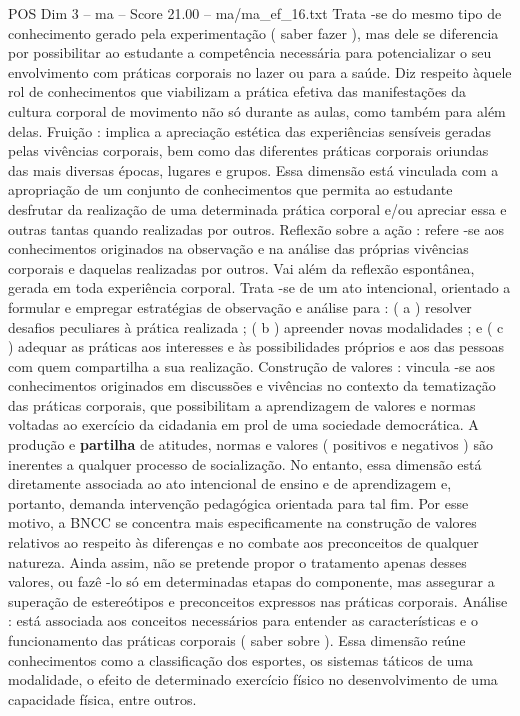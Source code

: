 \begin{textsample}{POS Dim 3 – ma – Score 21.00 – ma/ma\_ef\_16.txt}
Trata -se do mesmo tipo de conhecimento gerado pela experimentação ( saber fazer ), mas dele se diferencia por possibilitar ao estudante a competência necessária para potencializar o seu envolvimento com práticas corporais no lazer ou para a saúde.
Diz respeito àquele rol de conhecimentos que viabilizam a prática efetiva das manifestações da cultura corporal de movimento não só durante as aulas, como também para além delas.
Fruição : implica a apreciação estética das experiências sensíveis geradas pelas vivências corporais, bem como das diferentes práticas corporais oriundas das mais diversas épocas, lugares e grupos.
Essa dimensão está vinculada com a apropriação de um conjunto de conhecimentos que permita ao estudante desfrutar da realização de uma determinada prática corporal e/ou apreciar essa e outras tantas quando realizadas por outros.
Reflexão sobre a ação : refere -se aos conhecimentos originados na observação e na análise das próprias vivências corporais e daquelas realizadas por outros.
Vai além da reflexão espontânea, gerada em toda experiência corporal.
Trata -se de um ato intencional, orientado a formular e empregar estratégias de observação e análise para : ( a ) resolver desafios peculiares à prática realizada ; ( b ) apreender novas modalidades ; e ( c ) adequar as práticas aos interesses e às possibilidades próprios e aos das pessoas com quem compartilha a sua realização.
Construção de valores : vincula -se aos conhecimentos originados em discussões e vivências no contexto da tematização das práticas corporais, que possibilitam a aprendizagem de valores e normas voltadas ao exercício da cidadania em prol de uma sociedade democrática.
A produção e \textbf{partilha} de atitudes, normas e valores ( positivos e negativos ) são inerentes a qualquer processo de socialização.
No entanto, essa dimensão está diretamente associada ao ato intencional de ensino e de aprendizagem e, portanto, demanda intervenção pedagógica orientada para tal fim.
Por esse motivo, a BNCC se concentra mais especificamente na construção de valores relativos ao respeito às diferenças e no combate aos preconceitos de qualquer natureza.
Ainda assim, não se pretende propor o tratamento apenas desses valores, ou fazê -lo só em determinadas etapas do componente, mas assegurar a superação de estereótipos e preconceitos expressos nas práticas corporais.
Análise : está associada aos conceitos necessários para entender as características e o funcionamento das práticas corporais ( saber sobre ).
Essa dimensão reúne conhecimentos como a classificação dos esportes, os sistemas táticos de uma modalidade, o efeito de determinado exercício físico no desenvolvimento de uma capacidade física, entre outros.

\end{textsample}
